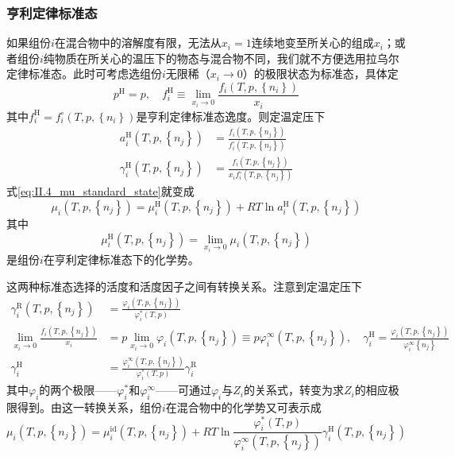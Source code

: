 \documentclass[main.tex]{subfiles}
\begin{document}
\subsubsection{亨利定律标准态}
如果组份$i$在混合物中的溶解度有限，无法从$x_i=1$连续地变至所关心的组成$x_i$；或者组份$i$纯物质在所关心的温压下的物态与混合物不同，我们就不方便选用拉乌尔定律标准态。此时可考虑选组份$i$无限稀（$x_i\rightarrow 0$）的极限状态为标准态，具体定
\[p^\text{H}=p,\quad f_i^\text{H}\equiv\lim_{x_i\to 0}\frac{f_i\left(T,p,\left\{n_i\right\}\right)}{x_i}\]
其中$f_i^\text{H}=f_i^\circ\left(T,p,\left\{n_i\right\}\right)$是亨利定律标准态逸度。则定温定压下
\begin{align*}
    a_i^\text{H}\left(T,p,\left\{n_j\right\}\right)      & =\frac{f_i\left(T,p,\left\{n_j\right\}\right)}{f_i^\circ\left(T,p,\left\{n_j\right\}\right)}    \\
    \gamma_i^\text{H}\left(T,p,\left\{n_j\right\}\right) & =\frac{f_i\left(T,p,\left\{n_j\right\}\right)}{x_if_i^\circ\left(T,p,\left\{n_j\right\}\right)}
\end{align*}
式\eqref{eq:II.4_mu_standard_state}就变成
\begin{equation*}
    \mu_i\left(T,p,\left\{n_j\right\}\right) =\mu_i^\text{H}\left(T,p,\left\{n_j\right\}\right)+RT\ln a_i^\text{H}\left(T,p,\left\{n_j\right\}\right)
\end{equation*}
其中
\[\mu_i^\text{H}\left(T,p,\left\{n_j\right\}\right)=\lim_{x_i\to 0}\mu_i\left(T,p,\left\{n_j\right\}\right)\]
是组份$i$在亨利定律标准态下的化学势。

这两种标准态选择的活度和活度因子之间有转换关系。注意到定温定压下
\begin{align*}
    \gamma_i^\text{R}\left(T,p,\left\{n_j\right\}\right)              & =\frac{\varphi_i\left(T,p,\left\{n_j\right\}\right)}{\varphi_i^*\left(T,p\right)}                                                                                                                                                       \\
    \lim_{x_i\to 0}\frac{f_i\left(T,p,\left\{n_j\right\}\right)}{x_i} & =p\lim_{x_i\to 0}\varphi_i\left(T,p,\left\{n_j\right\}\right)\equiv p\varphi_i^\infty\left(T,p,\left\{n_j\right\}\right),\quad\gamma_i^\text{H}=\frac{\varphi_i\left(T,p,\left\{n_j\right\}\right)}{\varphi_i^\infty\left\{n_j\right\}} \\
    \gamma_i^\text{H}                                                 & =\frac{\varphi_i^\infty\left(T,p,\left\{n_j\right\}\right)}{\varphi_i^*\left(T,p\right)}\gamma_i^\text{R}
\end{align*}
其中$\varphi_i$的两个极限——$\varphi_i^*$和$\varphi_i^\infty$——可通过$\varphi_i$与$Z_i$的关系式，转变为求$Z_i$的相应极限得到。由这一转换关系，组份$i$在混合物中的化学势又可表示成
\[\mu_i\left(T,p,\left\{n_j\right\}\right)=\mu_i^\text{id}\left(T,p,\left\{n_j\right\}\right)+RT\ln\frac{\varphi_i^*\left(T,p\right)}{\varphi_i^\infty\left(T,p,\left\{n_j\right\}\right)}\gamma_i^\text{H}\left(T,p,\left\{n_j\right\}\right)\]
\end{document}
